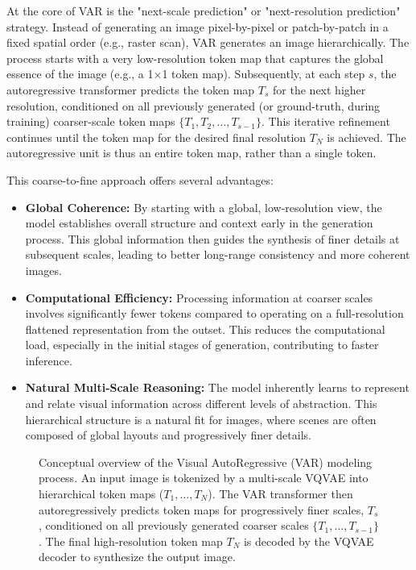 \documentclass{article}
\begin{document}
At the core of VAR is the "next-scale prediction" or "next-resolution prediction" strategy. Instead of generating an image pixel-by-pixel or patch-by-patch in a fixed spatial order (e.g., raster scan), VAR generates an image hierarchically. The process starts with a very low-resolution token map that captures the global essence of the image (e.g., a 1$\times$1 token map). Subsequently, at each step $s$, the autoregressive transformer predicts the token map $T_s$ for the next higher resolution, conditioned on all previously generated (or ground-truth, during training) coarser-scale token maps $\{T_1, T_2, \ldots, T_{s-1}\}$. This iterative refinement continues until the token map for the desired final resolution $T_N$ is achieved. The autoregressive unit is thus an entire token map, rather than a single token.

This coarse-to-fine approach offers several advantages:
\begin{itemize}[leftmargin=*,itemsep=2pt,topsep=3pt]
    \item \textbf{Global Coherence:} By starting with a global, low-resolution view, the model establishes overall structure and context early in the generation process. This global information then guides the synthesis of finer details at subsequent scales, leading to better long-range consistency and more coherent images.
    \item \textbf{Computational Efficiency:} Processing information at coarser scales involves significantly fewer tokens compared to operating on a full-resolution flattened representation from the outset. This reduces the computational load, especially in the initial stages of generation, contributing to faster inference.
    \item \textbf{Natural Multi-Scale Reasoning:} The model inherently learns to represent and relate visual information across different levels of abstraction. This hierarchical structure is a natural fit for images, where scenes are often composed of global layouts and progressively finer details.
\end{itemize}

\begin{figure}[htbp] %
\centering
\fbox{\rule{0.9\textwidth}{8cm}} %
\caption{Conceptual overview of the Visual AutoRegressive (VAR) modeling process. An input image is tokenized by a multi-scale VQVAE into hierarchical token maps ($T_1, \ldots, T_N$). The VAR transformer then autoregressively predicts token maps for progressively finer scales, $T_s$, conditioned on all previously generated coarser scales $\{T_1, \ldots, T_{s-1}\}$. The final high-resolution token map $T_N$ is decoded by the VQVAE decoder to synthesize the output image.}
\label{fig:var_process}
\end{figure}
\end{document}
